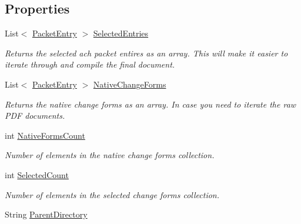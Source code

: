 \subsection*{Properties}
\begin{DoxyCompactItemize}
\item 
List$<$ \hyperlink{class_a_c_h_clerk_1_1_packet_entry}{Packet\+Entry} $>$ \hyperlink{class_a_c_h_clerk_1_1_clerk_a6008f6df10bc7cfeef39781e346138b9}{Selected\+Entries}
\begin{DoxyCompactList}\small\item\em Returns the selected ach packet entires as an array. This will make it easier to iterate through and compile the final document. \end{DoxyCompactList}\item 
List$<$ \hyperlink{class_a_c_h_clerk_1_1_packet_entry}{Packet\+Entry} $>$ \hyperlink{class_a_c_h_clerk_1_1_clerk_afbfeb34af163cd64ec151b344953d79f}{Native\+Change\+Forms}
\begin{DoxyCompactList}\small\item\em Returns the native change forms as an array. In case you need to iterate the raw P\+D\+F documents. \end{DoxyCompactList}\item 
int \hyperlink{class_a_c_h_clerk_1_1_clerk_a1c410f7a2fb912b3e62873b5da40323a}{Native\+Forms\+Count}
\begin{DoxyCompactList}\small\item\em Number of elements in the native change forms collection. \end{DoxyCompactList}\item 
int \hyperlink{class_a_c_h_clerk_1_1_clerk_a030ee3e580ed999b00e4fd4f4988a5a6}{Selected\+Count}
\begin{DoxyCompactList}\small\item\em Number of elements in the selected change forms collection. \end{DoxyCompactList}\item 
String \hyperlink{class_a_c_h_clerk_1_1_clerk_ac896f8970b723c849fb728bbc4fbdefd}{Parent\+Directory}

\end{DoxyCompactItemize}
